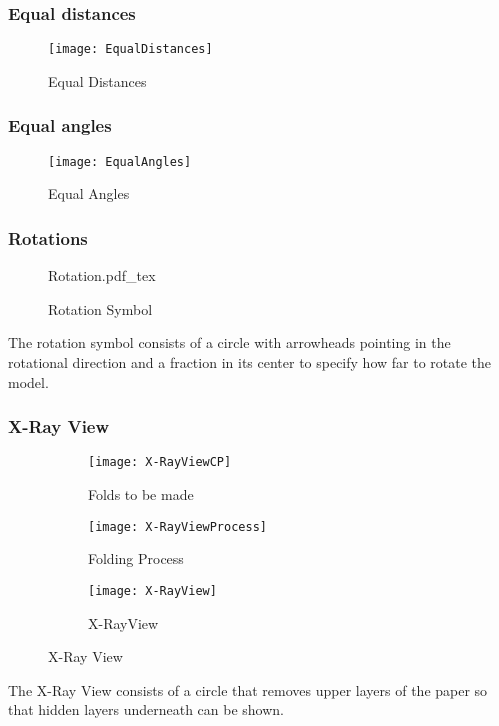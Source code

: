 \subsubsection*{Equal distances}
\begin{figure}[htbp]
	\centering
	\texttt{[image: EqualDistances]}
	\caption{Equal Distances}
	\label{fig:equalDistances}
\end{figure}

\subsubsection*{Equal angles}
\begin{figure}[htbp]
	\centering
	\texttt{[image: EqualAngles]}
	\caption{Equal Angles}
	\label{fig:equalAngles}
\end{figure}

\subsubsection*{Rotations }
\begin{figure}[htbp]
	\centering
	\def\svgwidth{0.2\textwidth}
	{Rotation.pdf_tex}
	\caption{Rotation Symbol}
	\label{fig:rotation}
\end{figure}
\noindent The rotation symbol consists of a circle with arrowheads pointing in the rotational direction and a fraction in its center to specify how far to rotate the model.

\subsubsection*{X-Ray View}
\begin{figure*}[htbp]
    \centering
    \begin{subfigure}{0.3\textwidth}
        \texttt{[image: X-RayViewCP]}
        \caption{Folds to be made}
        \label{fig:x-rayViewCP}
    \end{subfigure}
    \begin{subfigure}{0.3\textwidth}
        \texttt{[image: X-RayViewProcess]}
        \caption{Folding Process}
        \label{fig:x-rayViewProcess}
    \end{subfigure}
    \begin{subfigure}{0.5\textwidth}
        \texttt{[image: X-RayView]}
        \caption{X-RayView}
        \label{fig:x-rayViewFinal}
    \end{subfigure}
    \caption{X-Ray View}
    \label{fig:x-rayView}
\end{figure*}
\noindent The X-Ray View consists of a circle that removes upper layers of the paper so that hidden layers underneath can be shown.
\newpage
